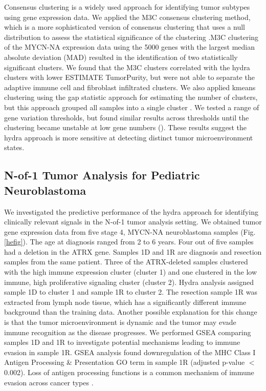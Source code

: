 \documentclass[10pt,letterpaper]{article}
\begin{document}
Consensus clustering is a widely used approach for identifying tumor subtypes using gene expression data. We applied the M3C consensus clustering method, which is a more sophisticated version of consensus clustering that uses a null distribution to assess the statistical significance of the clustering \cite{johnM3CMonteCarlo2018, wilkersonConsensusClusterPlusClassDiscovery2010}.M3C clustering of the MYCN-NA expression data using the 5000 genes with the largest median absolute deviation (MAD) resulted in the identification of two statistically significant clusters. We found that the M3C clusters correlated with the hydra clusters with lower ESTIMATE TumorPurity, but were not able to separate the adaptive immune cell and fibroblast infiltrated clusters. We also applied kmeans clustering using the gap statistic approach for estimating the number of clusters, but this approach grouped all samples into a single cluster \cite{tibshirani2001estimating,maechler2012cluster}. We tested a range of gene variation thresholds, but found similar results across thresholds until the clustering became unstable at low gene numbers (). These results suggest the hydra approach is more sensitive at detecting distinct tumor microenvironment states.

\subsection{N-of-1 Tumor Analysis for Pediatric Neuroblastoma}
We investigated the predictive performance of the hydra approach for identifying clinically relevant signals in the N-of-1 tumor analysis setting. We obtained tumor gene expression data from five stage 4, MYCN-NA neuroblastoma samples (Fig. \ref{hefig}). The age at diagnosis ranged from 2 to 6 years. Four out of five samples had a deletion in the ATRX gene. Samples 1D and 1R are diagnosis and resection samples from the same patient. Three of the ATRX-deleted samples clustered with the high immune expression cluster (cluster 1) and one clustered in the low immune, high proliferative signaling cluster (cluster 2). Hydra analysis assigned sample 1D to cluster 1 and sample 1R to cluster 2. The resection sample 1R was extracted from lymph node tissue, which has a significantly different immune background than the training data. Another possible explanation for this change is that the tumor microenvironment is dynamic and the tumor may evade immune recognition as the disease progresses. We performed GSEA comparing samples 1D and 1R to investigate potential mechanisms leading to immune evasion in sample 1R. GSEA analysis found downregulation of the MHC Class I Antigen Processing \& Presentation GO term in sample 1R (adjusted p-value $<$ 0.002). Loss of antigen processing functions is a common mechanism of immune evasion across cancer types \cite{reevesAntigenProcessingImmune2017}.
\end{document}
